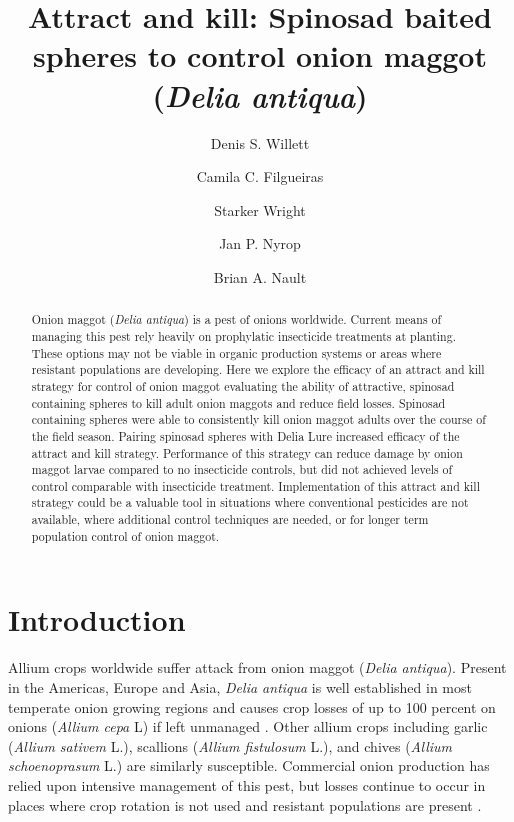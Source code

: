 \documentclass[alpha-refs]{wiley-article}
\title{Attract and kill: Spinosad baited spheres to control onion maggot (\textit{Delia antiqua})}
\author[1\authfn{1}]{Denis S. Willett}
\author[1\authfn{1}]{Camila C. Filgueiras}
\author[2]{Starker Wright}
\author[1]{Jan P. Nyrop}
\author[1]{Brian A. Nault}
\affil[1]{Department of Entomology, Cornell AgriTech, Cornell University, Geneva, NY, 14456, USA}
\affil[2]{Bartlett Tree Experts, Dublin, PA, USA}
\begin{document}
\maketitle

\begin{abstract}

Onion maggot (\textit{Delia antiqua}) is a pest of onions worldwide.  Current means of managing this pest rely heavily on prophylatic insecticide treatments at planting.  These options may not be viable in organic production systems or areas where resistant populations are developing.  Here we explore the efficacy of an attract and kill strategy for control of onion maggot evaluating the ability of attractive, spinosad containing spheres to kill adult onion maggots and reduce field losses.  Spinosad containing spheres were able to consistently kill onion maggot adults over the course of the field season.  Pairing spinosad spheres with Delia Lure increased efficacy of the attract and kill strategy.  Performance of this strategy can reduce damage by onion maggot larvae compared to no insecticide controls, but did not achieved levels of control comparable with insecticide treatment. Implementation of this attract and kill strategy could be a valuable tool in situations where conventional pesticides are not available, where additional control techniques are needed, or for longer term population control of onion maggot.   

\end{abstract}

\linenumbers
\section{Introduction}

Allium crops worldwide suffer attack from onion maggot (\textit{Delia antiqua}).  Present in the Americas, Europe and Asia, \textit{Delia antiqua} is well established in most temperate onion growing regions and causes crop losses of up to 100 percent on onions (\textit{Allium cepa} L) if left unmanaged \citep{nault2006performance, nault2006onion}.  Other allium crops including garlic (\textit{Allium sativem} L.), scallions (\textit{Allium fistulosum} L.), and chives (\textit{Allium schoenoprasum} L.) are similarly susceptible\citep{ellis1979factors,ning2017predicting,nault2007ecology, }.  Commercial onion production has relied upon intensive management of this pest, but losses continue to occur in places where crop rotation is not used and resistant populations are present \citep{martinson1988dispersal, nault2006onion}.  
\end{document}
